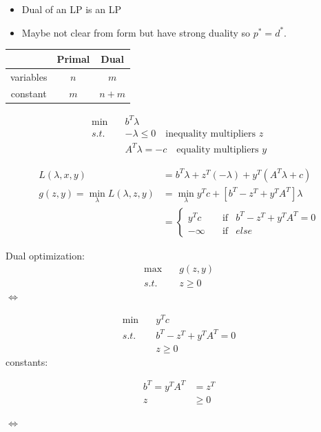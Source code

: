 \begin{itemize}
	\item Dual of an LP is an LP
	
	\item Maybe not clear from form but have strong duality so $p^*=d^*$.
\end{itemize}

\begin{tabular}{|c|c|c|}
	\hline 
	&Primal & Dual\\
	\hline  
	variables & $n$ & $m$\\
	\hline 
	constant&$m$&$n+m$\\
	\hline 
\end{tabular}


\begin{align*}
\min\quad &b^T\lambda\\
s.t.\quad &-\lambda\leq 0\quad\text{inequality multipliers }z\\
&A^T\lambda = -c\quad \text{equality multipliers }y
\end{align*}

\begin{align*}
L(\lambda,x,y) &= b^T\lambda + z^T(-\lambda)+y^T(A^T\lambda + c)\\
g(z,y) = \min_{\lambda}L(\lambda,z,y) &= \min_{\lambda}y^Tc+[b^T-z^T+y^TA^T]\lambda\\
&=
\left\{
\begin{aligned}
y^Tc &\quad \text{if} &b^T-z^T+y^TA^T=0 \\
-\infty &\quad \text{if} &else
\end{aligned}
\right.
\end{align*}




Dual optimization:
\begin{align*}
\max\quad &g(z,y)\\
s.t.\quad &z \geq 0
\end{align*}
$\Leftrightarrow$


\begin{align*}
\min\quad &y^Tc\\
s.t.\quad &b^T-z^T+y^TA^T=0\\
&z\geq 0
\end{align*}
constants:


\begin{align*}
b^T=y^TA^T &= z^T\\
z&\geq 0
\end{align*}

$\Leftrightarrow$

